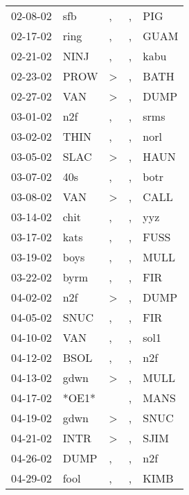 \begin{supertabular}{lllll}
 02-08-02 &    sfb &                , &                , &    PIG \\
 02-17-02 &   ring &                , &                , &   GUAM \\
 02-21-02 &   NINJ &                , &                , &   kabu \\
 02-23-02 &   PROW &     \textgreater &                , &   BATH \\
 02-27-02 &    VAN &     \textgreater &                , &   DUMP \\
 03-01-02 &    n2f &                , &                , &   srms \\
 03-02-02 &   THIN &                , &                , &   norl \\
 03-05-02 &   SLAC &     \textgreater &                , &   HAUN \\
 03-07-02 &    40s &                , &                , &   botr \\
 03-08-02 &    VAN &     \textgreater &                , &   CALL \\
 03-14-02 &   chit &                , &                , &    yyz \\
 03-17-02 &   kats &                , &                , &   FUSS \\
 03-19-02 &   boys &                , &                , &   MULL \\
 03-22-02 &   byrm &                , &                , &    FIR \\
 04-02-02 &    n2f &     \textgreater &                , &   DUMP \\
 04-05-02 &   SNUC &                , &                , &    FIR \\
 04-10-02 &    VAN &                , &                , &   sol1 \\
 04-12-02 &   BSOL &                , &                , &    n2f \\
 04-13-02 &   gdwn &     \textgreater &                , &   MULL \\
 04-17-02 &  *OE1* &                  &                , &   MANS \\
 04-19-02 &   gdwn &     \textgreater &                , &   SNUC \\
 04-21-02 &   INTR &     \textgreater &                , &   SJIM \\
 04-26-02 &   DUMP &                , &                , &    n2f \\
 04-29-02 &   fool &                , &                , &   KIMB \\

\end{supertabular}
